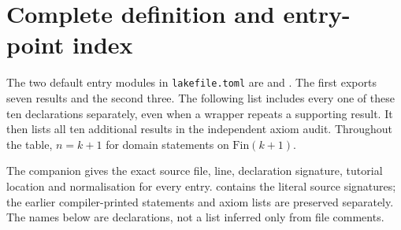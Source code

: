 \section{Complete definition and entry-point index}\label{app:correspondence}
The two default entry modules in \texttt{lakefile.toml} are
 and . The first exports seven
results and the second three. The following list includes every one
of these ten declarations separately, even when a wrapper repeats a
supporting result. It then lists all ten additional results in the
independent axiom audit. Throughout the table, \(n=k+1\) for domain
statements on \(\mathrm{Fin}(k+1)\).

The companion  gives the exact
source file, line, declaration signature, tutorial location and
normalisation for every entry. 
contains the literal source signatures; the earlier compiler-printed
statements and axiom lists are preserved separately. The names below
are declarations, not a list inferred only from file comments.


